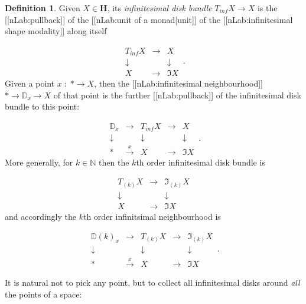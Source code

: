 \documentclass[12pt,titlepage]{article}
\newcommand{\itexarray}[1]{\begin{matrix}#1\end{matrix}}
\theoremstyle{plain}
\theoremstyle{definition}
\newtheorem{defn}{Definition}
\theoremstyle{remark}
\begin{document}
\begin{defn}
\label{InfinitesimalDiskBundle}\hypertarget{InfinitesimalDiskBundle}{}
Given $X \in \mathbf{H}$, its \emph{infinitesimal disk bundle} $T_{inf} X\to X$ is the [[nLab:pullback]] of the [[nLab:unit of a monad|unit]] of the [[nLab:infinitesimal shape modality]] along itself

\begin{displaymath}
\itexarray{
    T_{inf} X &\stackrel{}{\longrightarrow}& X
    \\
    \downarrow && \downarrow
    \\
    X &\longrightarrow& \Im X
  }
  \,.
\end{displaymath}
Given a point $x \;\colon\;  \ast \to X$, then the [[nLab:infinitesimal neighbourhood]] $\ast \to \mathbb{D}_x \to X$ of that point is the further [[nLab:pullback]] of the infinitesimal disk bundle to this point:

\begin{displaymath}
\itexarray{
    \mathbb{D}_x &\longrightarrow & T_{inf} X &\stackrel{}{\longrightarrow}& X
    \\
    \downarrow && \downarrow && \downarrow
    \\
    \ast &\stackrel{x}{\longrightarrow} & X &\longrightarrow& \Im X
  }
  \,.
\end{displaymath}
More generally, for $k \in \mathbb{N}$ then the $k$th order infinitesimal disk bundle is

\begin{displaymath}
\itexarray{
    T_{(k)} X &\stackrel{}{\longrightarrow}& \Im_{(k)} X
    \\
    \downarrow && \downarrow
    \\
    X &\longrightarrow& \Im X
  }
\end{displaymath}
and accordingly the $k$th order infinitsimal neighbourhood is

\begin{displaymath}
\itexarray{
    \mathbb{D}(k)_x &\longrightarrow & T_{(k)} X &\stackrel{}{\longrightarrow}& \Im_{(k)}X
    \\
    \downarrow && \downarrow && \downarrow
    \\
    \ast &\stackrel{x}{\longrightarrow} & X &\longrightarrow& \Im X
  }
  \,.
\end{displaymath}
\end{defn}
It is natural not to pick any point, but to collect all infinitesimal disks around \emph{all} the points of a space:
\end{document}
